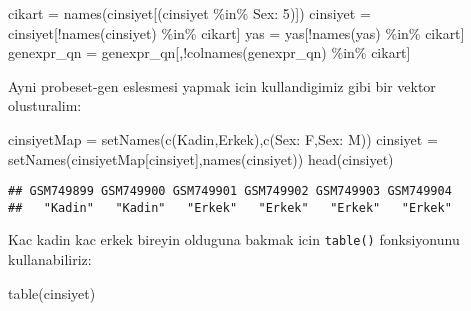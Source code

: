 \documentclass[
]{book}
\newenvironment{Shaded}{\begin{snugshade}}{\end{snugshade}}
\newcommand{\FunctionTok}[1]{\textcolor[rgb]{0.00,0.00,0.00}{#1}}
\newcommand{\NormalTok}[1]{#1}
\newcommand{\OtherTok}[1]{\textcolor[rgb]{0.56,0.35,0.01}{#1}}
\newcommand{\SpecialCharTok}[1]{\textcolor[rgb]{0.00,0.00,0.00}{#1}}
\newcommand{\StringTok}[1]{\textcolor[rgb]{0.31,0.60,0.02}{#1}}
\begin{document}
\begin{Shaded}
\begin{Highlighting}[]
\NormalTok{cikart }\OtherTok{=} \FunctionTok{names}\NormalTok{(cinsiyet[(cinsiyet }\SpecialCharTok{\%in\%} \StringTok{\textquotesingle{}Sex: 5\textquotesingle{}}\NormalTok{)])}
\NormalTok{cinsiyet }\OtherTok{=}\NormalTok{ cinsiyet[}\SpecialCharTok{!}\FunctionTok{names}\NormalTok{(cinsiyet) }\SpecialCharTok{\%in\%}\NormalTok{ cikart]}
\NormalTok{yas }\OtherTok{=}\NormalTok{ yas[}\SpecialCharTok{!}\FunctionTok{names}\NormalTok{(yas) }\SpecialCharTok{\%in\%}\NormalTok{ cikart]}
\NormalTok{genexpr\_qn }\OtherTok{=}\NormalTok{ genexpr\_qn[,}\SpecialCharTok{!}\FunctionTok{colnames}\NormalTok{(genexpr\_qn) }\SpecialCharTok{\%in\%}\NormalTok{ cikart]}
\end{Highlighting}
\end{Shaded}

Ayni probeset-gen eslesmesi yapmak icin kullandigimiz gibi bir vektor olusturalim:

\begin{Shaded}
\begin{Highlighting}[]
\NormalTok{cinsiyetMap }\OtherTok{=} \FunctionTok{setNames}\NormalTok{(}\FunctionTok{c}\NormalTok{(}\StringTok{\textquotesingle{}Kadin\textquotesingle{}}\NormalTok{,}\StringTok{\textquotesingle{}Erkek\textquotesingle{}}\NormalTok{),}\FunctionTok{c}\NormalTok{(}\StringTok{\textquotesingle{}Sex: F\textquotesingle{}}\NormalTok{,}\StringTok{\textquotesingle{}Sex: M\textquotesingle{}}\NormalTok{))}
\NormalTok{cinsiyet }\OtherTok{=} \FunctionTok{setNames}\NormalTok{(cinsiyetMap[cinsiyet],}\FunctionTok{names}\NormalTok{(cinsiyet))}
\FunctionTok{head}\NormalTok{(cinsiyet)}
\end{Highlighting}
\end{Shaded}

\begin{verbatim}
## GSM749899 GSM749900 GSM749901 GSM749902 GSM749903 GSM749904 
##   "Kadin"   "Kadin"   "Erkek"   "Erkek"   "Erkek"   "Erkek"
\end{verbatim}

Kac kadin kac erkek bireyin olduguna bakmak icin \texttt{table()} fonksiyonunu kullanabiliriz:

\begin{Shaded}
\begin{Highlighting}[]
\FunctionTok{table}\NormalTok{(cinsiyet)}
\end{Highlighting}
\end{Shaded}
\end{document}
